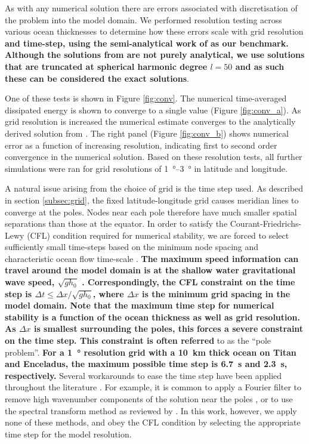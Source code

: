 As with any numerical solution there are errors associated with discretisation of the problem into the model domain. We performed resolution testing across various ocean thicknesses to determine how these errors scale with grid resolution \textbf{and time-step, using the semi-analytical work of \citet{matsuyama2014tidal} as our benchmark. Although the solutions from \citet{matsuyama2014tidal} are not purely analytical, we use solutions that are truncated at spherical harmonic degree $l=50$ and as such these can be considered the exact solutions}. 



One of these tests is shown in Figure \ref{fig:conv}. The numerical time-averaged dissipated energy is shown to converge to a single value (Figure \ref{fig:conv_a}). As grid resolution is increased the numerical estimate converges to the analytically derived solution from \citet{matsuyama2014tidal}. The right panel (Figure \ref{fig:conv_b}) shows numerical error as a function of increasing resolution, indicating first to second order convergence in the numerical solution. Based on these resolution tests, all further simulations were ran for grid resolutions of \SIrange{1}{3}{\degree} in latitude and longitude. 

A natural issue arising from the choice of grid is the time step used. As described in section \ref{subsec:grid}, the fixed latitude-longitude grid causes meridian lines to converge at the poles. Nodes near each pole therefore have much smaller spatial separations than those at the equator. In order to satisfy the Courant-Friedrichs-Lewy (CFL) condition required for numerical stability, we are forced to select sufficiently small time-steps based on the minimum node spacing and characteristic ocean flow time-scale \citep{arakawa1977computational,sears1995tidal}. \textbf{The maximum speed information can travel around the model domain is at the shallow water gravitational wave speed, $\sqrt{gh_0}$ \citep{lamb1932hydrodynamics}. Correspondingly, the CFL constraint on the time step is $\Delta t \leqslant \Delta x / \sqrt{gh_0}$, where $\Delta x$ is the minimum grid spacing in the model domain. Note that the maximum time step for numerical stability is a function of the ocean thickness as well as grid resolution. As $\Delta x$ is smallest surrounding the poles, this forces a severe constraint on the time step. This constraint is often referred} to as the ``pole problem''. \textbf{For a \SI{1}{\degree} resolution grid with a \SI{10}{\kilo\metre} thick ocean on Titan and Enceladus, the maximum possible time step is \SI{6.7}{\second} and \SI{2.3}{\second}, respectively.} Several workarounds to ease the time step have been applied throughout the literature \citep{comblen2009finite}. For example, it is common to apply a Fourier filter to remove high wavenumber components of the solution near the poles \citep{murray2002fourier}, or to use the spectral transform method as reviewed by \citet{swarztrauber1996spectral}. In this work, however, we apply none of these methods, and obey the CFL condition by selecting the appropriate time step for the model resolution.

